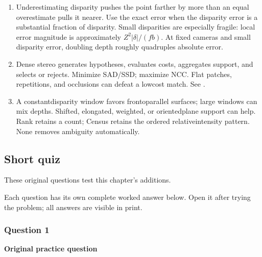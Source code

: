 \documentclass[letterpaper,11pt,english,openany,oneside]{jupyterBook}
\begin{document}
\begin{enumerate}
\item {}
\sphinxAtStartPar
{} Underestimating disparity pushes the point farther by more than an equal overestimate pulls it nearer. Use the exact error when the disparity error is a substantial fraction of disparity. Small disparities are especially fragile: local error magnitude is approximately \(Z^2|\delta|/(fb)\). At fixed cameras and small disparity error, doubling depth roughly quadruples absolute error.

\item {}
\sphinxAtStartPar
{} Dense stereo generates hypotheses, evaluates costs, aggregates support, and selects or rejects. Minimize SAD/SSD; maximize NCC. Flat patches, repetitions, and occlusions can defeat a low\sphinxhyphen{}cost match. See {\hyperref[\detokenize{lectures/lecture04/matching::doc}]{}}.

\item {}
\sphinxAtStartPar
{} A constant\sphinxhyphen{}disparity window favors fronto\sphinxhyphen{}parallel surfaces; large windows can mix depths. Shifted, elongated, weighted, or oriented\sphinxhyphen{}plane support can help. Rank retains a count; Census retains the ordered relative\sphinxhyphen{}intensity pattern. None removes ambiguity automatically.

\end{enumerate}

\newpage


\subsection{Short quiz}
\label{\detokenize{lectures/lecture04/tldr:short-quiz}}
\sphinxAtStartPar
These original questions test this chapter’s additions.

\sphinxAtStartPar
Each question has its own complete worked answer below. Open it after trying the problem; all answers are visible in print.


\subsubsection{Question 1}
\label{\detokenize{lectures/lecture04/tldr:question-1}}\label{\detokenize{lectures/lecture04/tldr:lec04-tldr-q1}}
\par\medskip\textbf{Original practice question}\par\smallskip
\end{document}
